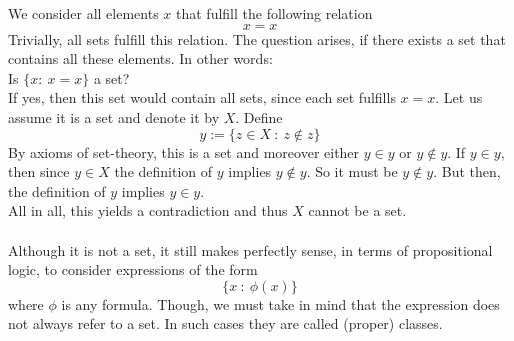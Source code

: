 \documentclass[17pt]{extarticle}
\begin{document}
We consider all elements $x$ that fulfill the following relation
$$x=x$$
Trivially, all sets fulfill this relation. The question arises, if there exists a set that
contains all these elements. In other words:\\
Is $\{x: \ x=x\}$ a set?\\
If yes, then this set would contain all sets, since each set fulfills $x=x$.
Let us assume it is a set and denote it by $X$. Define
$$y:=\{z\in X \ : \ z\notin z\}$$
By axioms of set-theory, this is a set and moreover either $y\in y$ or $y\notin y$.
If $y\in y$, then since $y\in X$ the definition of $y$ implies $y\notin y$. 
So it must be $y\notin y$. But then, the definition of $y$ implies $y\in y$.\\
All in all, this yields a contradiction and thus $X$ cannot be a set.\\ \\
Although it is not a set, it still makes perfectly sense, in terms of propositional logic, to consider
expressions of the form
$$\{x \ : \ \phi(x)\}$$
where $\phi$ is any formula. Though, we must take in mind that the expression does not always refer to a set. In such cases they are called (proper) classes.
\end{document}
